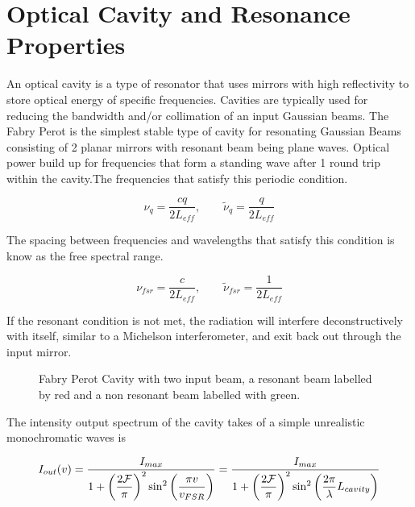 \documentclass[11pt,a4paper]{book}
\newcommand{\imginput}[1]{} %
\begin{document}
	\section{Optical Cavity and Resonance Properties}
		\label{sec:Optical Cavity and Resonance Properties}
		An optical cavity is a type of resonator that uses mirrors with high reflectivity to store optical energy of specific frequencies. Cavities are typically used for reducing the bandwidth and/or collimation of an input Gaussian beams. The Fabry Perot is the simplest stable type of cavity for resonating Gaussian Beams consisting of 2 planar mirrors with resonant beam being plane waves. Optical power build up for frequencies that form a standing wave after 1 round trip within the cavity.The frequencies that satisfy this periodic condition. 
		
		\begin{equation}\label{eq:resonantfreq}
			\nu_q=\dfrac{cq}{2L_{eff}}, \qquad \tilde{\nu}_q=\dfrac{q}{2L_{eff}}
		\end{equation}
		
		The spacing between frequencies and wavelengths that satisfy this condition is know as the free spectral range.
		
		\begin{equation}\label{eq:FSR}
			\nu_{fsr}=\dfrac{c}{2L_{eff}}, \qquad \tilde{\nu}_{fsr}=\dfrac{1}{2L_{eff}}
		\end{equation}	
		
		If the resonant condition is not met, the radiation will interfere deconstructively with itself, similar to a Michelson interferometer, and exit back out through the input mirror.			
		
		\begin{figure} 
			\centering
			\def\svgwidth{\columnwidth}
			\resizebox{160mm}{!}{\imginput{images/feb-per-cav.pdf_tex}}
			\caption{Fabry Perot Cavity with two input beam, a resonant beam labelled by red and a non resonant beam labelled with green.}
			\label{fig:feb-per-cav}
		\end{figure}
		
		The intensity output spectrum of the cavity takes of a simple unrealistic monochromatic waves is
		
		\begin{equation} \label{eq:res}
			\centering
			{I_{out} (v)}=\dfrac{I_{max}}{1+\bigg(\dfrac{2\mathcal{F}}{\pi}\bigg)^2 \sin^2\bigg({\dfrac{\pi v}{v_{FSR}}}\bigg)}=\dfrac{I_{max}}{1+\left(\dfrac{2\mathcal{F}}{\pi}\right)^2 \sin^2\left({ \dfrac{2\pi}{\lambda}} L_{cavity}\right)}
		\end{equation}
		
\end{document}
